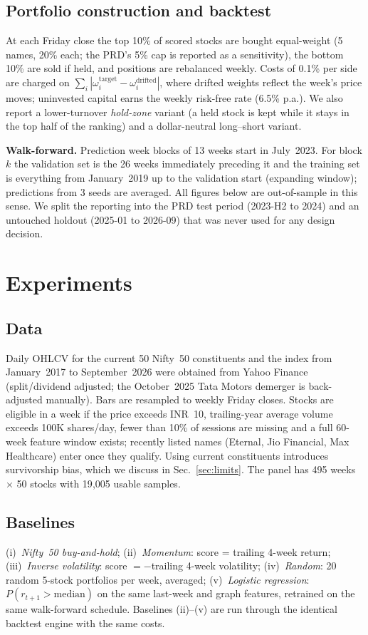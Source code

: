 \documentclass[conference]{IEEEtran}
\begin{document}
\subsection{Portfolio construction and backtest}
At each Friday close the top 10\% of scored stocks are bought equal-weight (5 names, 20\% each; the PRD's 5\% cap is reported as a sensitivity), the bottom 10\% are sold if held, and positions are rebalanced weekly. Costs of 0.1\% per side are charged on $\sum_i|\omega^{\text{target}}_i-\omega^{\text{drifted}}_i|$, where drifted weights reflect the week's price moves; uninvested capital earns the weekly risk-free rate (6.5\% p.a.). We also report a lower-turnover \emph{hold-zone} variant (a held stock is kept while it stays in the top half of the ranking) and a dollar-neutral long--short variant.

\textbf{Walk-forward.} Prediction week blocks of 13 weeks start in July~2023. For block $k$ the validation set is the 26 weeks immediately preceding it and the training set is everything from January~2019 up to the validation start (expanding window); predictions from 3 seeds are averaged. All figures below are out-of-sample in this sense. We split the reporting into the PRD test period (2023-H2 to 2024) and an untouched holdout (2025-01 to 2026-09) that was never used for any design decision.

\section{Experiments}
\subsection{Data}
Daily OHLCV for the current 50 Nifty~50 constituents and the index from January~2017 to September~2026 were obtained from Yahoo Finance (split/dividend adjusted; the October~2025 Tata Motors demerger is back-adjusted manually). Bars are resampled to weekly Friday closes. Stocks are eligible in a week if the price exceeds INR~10, trailing-year average volume exceeds 100K shares/day, fewer than 10\% of sessions are missing and a full 60-week feature window exists; recently listed names (Eternal, Jio Financial, Max Healthcare) enter once they qualify. Using current constituents introduces survivorship bias, which we discuss in Sec.~\ref{sec:limits}. The panel has 495 weeks $\times$ 50 stocks with 19{,}005 usable samples.

\subsection{Baselines}
(i)~\emph{Nifty~50 buy-and-hold}; (ii)~\emph{Momentum}: score = trailing 4-week return; (iii)~\emph{Inverse volatility}: score $=-$trailing 4-week volatility; (iv)~\emph{Random}: 20 random 5-stock portfolios per week, averaged; (v)~\emph{Logistic regression}: $P(r_{t+1}>\text{median})$ on the same last-week and graph features, retrained on the same walk-forward schedule. Baselines (ii)--(v) are run through the identical backtest engine with the same costs.
\end{document}
